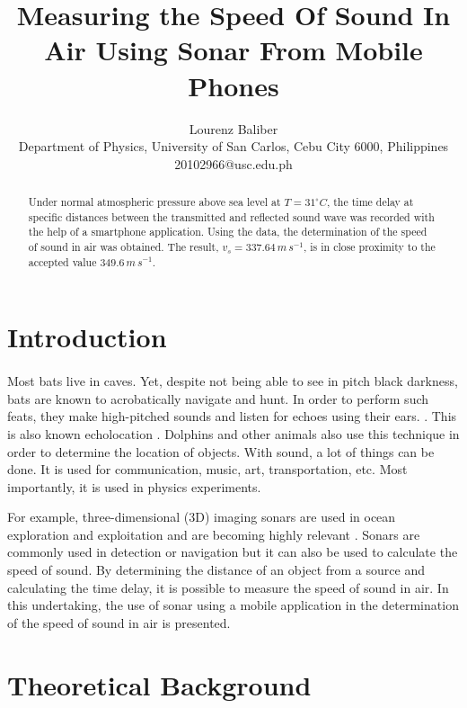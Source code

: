 \documentclass{article}
\title{Measuring the Speed Of Sound In Air Using Sonar From Mobile Phones}
\author{\normalsize Lourenz Baliber \\ \normalsize Department of Physics, University of San Carlos, Cebu City 6000, Philippines \\ \normalsize 20102966@usc.edu.ph}
\begin{document}
\maketitle

\begin{abstract}
\noindent Under normal atmospheric pressure above sea level at $T=31^{\circ}C$, the time delay at specific distances between the transmitted and reflected sound wave was recorded with the help of a smartphone application. Using the data, the determination of the speed of sound in air was obtained. The result, $v_{s} = 337.64 \, m \, s^{-1}$, is in close proximity to the accepted value $349.6 \, m \, s^{-1}$.
\end{abstract}

\begin{multicols}{2}
\section{Introduction}
\paragraph{}

Most bats live in caves. Yet, despite not being able to see in pitch black darkness, bats are known to acrobatically navigate and hunt. In order to perform such feats, they make high-pitched sounds and listen for echoes using their ears. . This is also known echolocation \cite{bats}. Dolphins and other animals also use this technique in order to determine the location of objects. With sound, a lot of things can be done. It is used for communication, music, art, transportation, etc. Most importantly, it is used in physics experiments.

For example, three-dimensional (3D) imaging sonars are used in ocean exploration and exploitation and are becoming highly relevant \cite{sonar}. Sonars are commonly used in detection or navigation but it can also be used to calculate the speed of sound. By determining the distance of an object from a source and calculating the time delay, it is possible to measure the speed of sound in air. In this undertaking, the use of sonar using a mobile application in the determination of the speed of sound in air is presented.  
\section{Theoretical Background}
\paragraph{}


\end{multicols}
\end{document}
